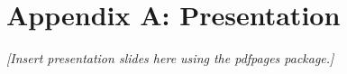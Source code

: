 \documentclass[12pt,a4paper]{report}
\begin{document}
\chapter*{Appendix A: Presentation}
% 
\textit{[Insert presentation slides here using the pdfpages package.]}
\end{document}
